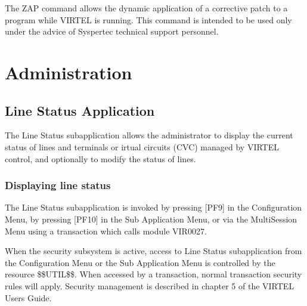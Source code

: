 \documentclass[letterpaper,10pt,english]{sphinxmanual}
\begin{document}
\sphinxAtStartPar
The ZAP command allows the dynamic application of a corrective patch to a program while VIRTEL is running. This command is intended to be used only under the advice of Syspertec technical support personnel.

\ignorespaces 

\chapter{Administration}
\label{\detokenize{audit_operations_ and_performance:administration}}\label{\detokenize{audit_operations_ and_performance:index-35}}
\ignorespaces 

\section{Line Status Application}
\label{\detokenize{audit_operations_ and_performance:line-status-application}}\label{\detokenize{audit_operations_ and_performance:index-36}}
\sphinxAtStartPar
The Line Status sub\sphinxhyphen{}application allows the administrator to display the current status of lines and terminals or irtual circuits (CVC) managed by VIRTEL control, and optionally to modify the status of lines.

\ignorespaces 

\subsection{Displaying line status}
\label{\detokenize{audit_operations_ and_performance:displaying-line-status}}\label{\detokenize{audit_operations_ and_performance:index-37}}
\sphinxAtStartPar
The Line Status sub\sphinxhyphen{}application is invoked by pressing {[}PF9{]} in the Configuration Menu, by pressing {[}PF10{]} in the Sub\sphinxhyphen{} Application Menu, or via the Multi\sphinxhyphen{}Session Menu using a transaction which calls module VIR0027.

\sphinxAtStartPar
When the security subsystem is active, access to Line Status sub\sphinxhyphen{}application from the Configuration Menu or the Sub\sphinxhyphen{} Application Menu is controlled by the resource \$\$UTIL\$\$.
When accessed by a transaction, normal transaction security rules will apply. Security management is described in chapter 5 of the VIRTEL Users Guide.
\end{document}
